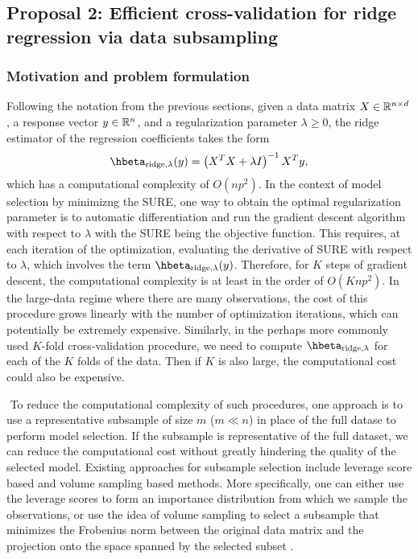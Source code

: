 \pagebreak

\subsection{Proposal 2: Efficient cross-validation for ridge regression via data subsampling} %
\subsubsection{Motivation and problem formulation}
Following the notation from the previous sections, given a data matrix $X\in\mathbb{R}^{n\times d}$, a response vector $y\in\mathbb{R}^n$, and a regularization parameter $\lambda\geq0$, the ridge estimator of the regression coefficients takes the form
\[
\hbeta_{\text{ridge}, \lambda}(y) = \left( X^TX + \lambda I \right)^{-1}X^Ty,
\]
which has a computational complexity of $O(np^2)$. In the context of model selection by minimizng the SURE, one way to obtain the optimal regularization parameter is to automatic differentiation and run the gradient descent algorithm with respect to $\lambda$ with the SURE being the objective function. This requires, at each iteration of the optimization, evaluating the derivative of SURE with respect to $\lambda$, which involves the term $\hbeta_{\text{ridge}, \lambda}(y)$. Therefore, for $K$ steps of gradient descent, the computational complexity is at least in the order of $O(Knp^2)$. In the large-data regime where there are many observations, the cost of this procedure grows linearly with the number of optimization iterations, which can potentially be extremely expensive. Similarly, in the perhaps more commonly used $K$-fold cross-validation procedure, we need to compute $\hbeta_{\text{ridge}, \lambda}$ for each of the $K$ folds of the data. Then if $K$ is also large, the computational cost could also be expensive.

$ $\newline
To reduce the computational complexity of such procedures, one approach is to use a representative subsample of size $m$ ($m\ll n$) in place of the full datase to perform model selection. If the subsample is representative of the full dataset, we can reduce the computational cost without greatly hindering the quality of the selected model. Existing approaches for subsample selection include leverage score based and volume sampling based methods. More specifically, one can either use the leverage scores to form an importance distribution from which we sample the observations, or use the idea of volume sampling to select a subsample that minimizes the Frobenius norm between the original data matrix and the projection onto the space spanned by the selected subset \citep{ma2014statistical,avron2010blendenpik}.

